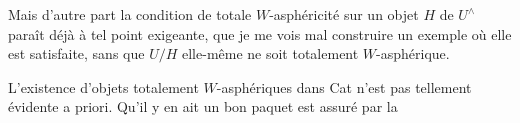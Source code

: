 \documentclass[11pt]{article}
\newcommand{\msp}[1]{\marginpar{\footnotesize [#1]}}
\begin{document}
Mais d'autre part la condition de totale $W$-asphéricité sur un objet $H$ de $U^{\wedge}$ paraît déjà à tel point exigeante, que je me vois mal con\msp{page 97}struire un exemple où elle est satisfaite, sans que $U/H$ elle-même ne soit totalement $W$-asphérique.

L'existence d'objets totalement $W$-asphériques dans Cat n'est pas tellement évidente a priori. Qu'il y en ait un bon paquet est assuré par la
\end{document}
